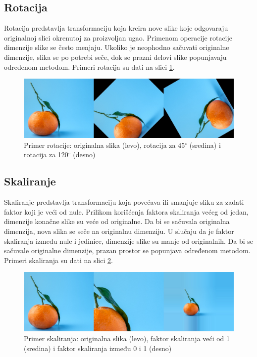 \documentclass[12pt,oneside]{memoir}
\begin{document}
\subsection{Rotacija}
Rotacija predstavlja transformaciju koja kreira nove slike koje odgovaraju originalnoj slici okrenutoj za proizvoljan ugao. Primenom operacije rotacije dimenzije slike se često menjaju. Ukoliko je neophodno sačuvati originalne dimenzije, slika se po potrebi seče, dok se prazni delovi slike popunjavaju određenom metodom. Primeri rotacija su dati na slici \ref{fig:section3_rot}. 

\begin{figure}[ht]
    \centering
    \includegraphics[width=1\textwidth]{matfmaster/glava3/rotate.jpg}
    \caption{Primer rotacije: originalna slika (levo), rotacija za 45\(^\circ\) (sredina) i  rotacija za 120\(^\circ\) (desno) \cite{unsplashOrange}}
    \label{fig:section3_rot}
\end{figure}

\subsection{Skaliranje}
Skaliranje predstavlja transformaciju koja povećava ili smanjuje sliku za zadati faktor koji je veći od nule. Prilikom korišćenja faktora skaliranja većeg od jedan, dimenzije konačne slike su veće od originalne. Da bi se sačuvala originalna dimenzija, nova slika se seče na originalnu dimenziju. U slučaju da je faktor skaliranja između nule i jedinice, dimenzije slike su manje od originalnih. Da bi se sačuvale originalne dimenzije, prazan prostor se popunjava određenom metodom. Primeri skaliranja su dati na slici \ref{fig:section3_scale}.

\begin{figure}[ht]
    \centering
    \includegraphics[width=1\textwidth]{matfmaster/glava3/scale.jpg}
    \caption{Primer skaliranja: originalna slika (levo), faktor skaliranja veći od 1 (sredina) i faktor skaliranja između 0 i 1 (desno) \cite{unsplashOrange}}
    \label{fig:section3_scale}
\end{figure}
\end{document}
